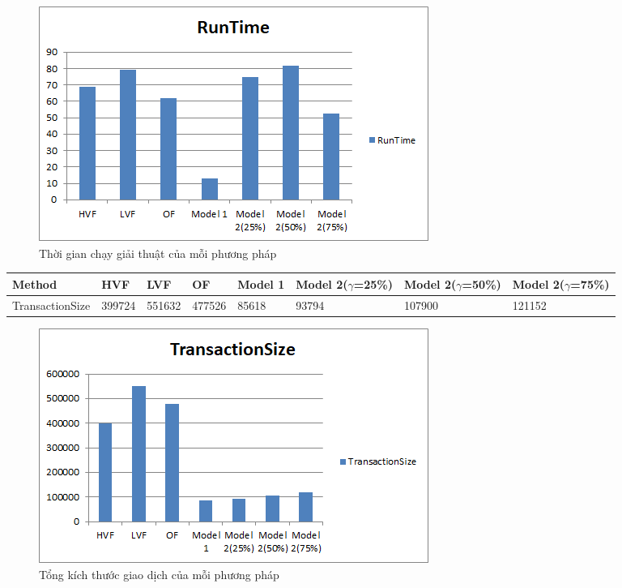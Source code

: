 \documentclass[a4paper]{article}
\begin{document}
\begin{center}
	\begin{figure} [H]
		\begin{center}
			\includegraphics[scale=1]{RunTime}
		\end{center}
		\caption{Thời gian chạy giải thuật của mỗi phương pháp}
		\label{refhinh1}
	\end{figure}
\end{center}

\begin{table}[H]
	\begin{tabular}{|l|l|l|l|l|l|l|l|}
		\hline
		Method  & HVF & LVF & OF & Model 1 & Model 2($\gamma$=25\%) & Model 2($\gamma$=50\%) & Model 2($\gamma$=75\%) \\ \hline
		TransactionSize & 399724 & 551632 & 477526 & 85618   & 93794         & 107900        & 121152        \\ \hline
	\end{tabular}
\end{table}

\begin{center}
	\begin{figure} [H]
		\begin{center}
			\includegraphics[scale=1]{TransactionSize}
		\end{center}
		\caption{Tổng kích thước giao dịch của mỗi phương pháp}
		\label{refhinh1}
	\end{figure}
\end{center}
\end{document}
